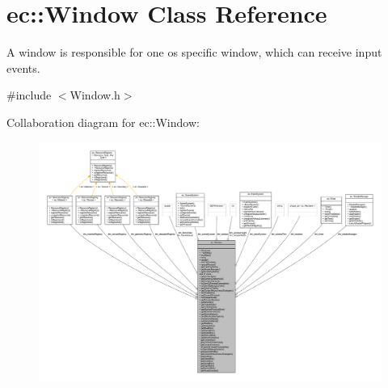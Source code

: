 \hypertarget{classec_1_1_window}{}\section{ec\+:\+:Window Class Reference}
\label{classec_1_1_window}


A window is responsible for one os specific window, which can receive input events.  




{\ttfamily \#include $<$Window.\+h$>$}



Collaboration diagram for ec\+:\+:Window\+:\nopagebreak
\begin{figure}[H]
\begin{center}
\leavevmode
\includegraphics[width=350pt]{classec_1_1_window__coll__graph}
\end{center}
\end{figure}
